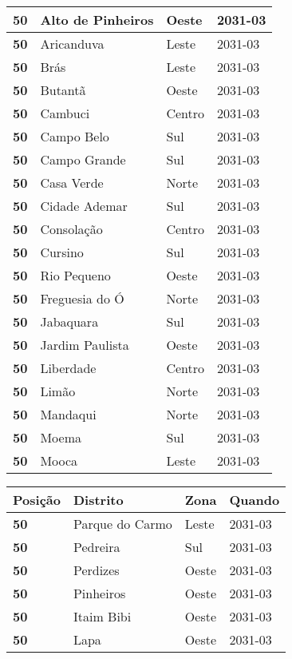 \begin{table}[H]
\begin{tabular}{l|l|l|l}
		\textbf{50} & Alto de Pinheiros & Oeste & 2031-03\\ \hline
		\textbf{50} & Aricanduva & Leste & 2031-03\\ \hline
		\textbf{50} & Brás & Leste & 2031-03\\ \hline
		\textbf{50} & Butantã & Oeste & 2031-03\\ \hline
		\textbf{50} & Cambuci & Centro & 2031-03\\ \hline
		\textbf{50} & Campo Belo & Sul & 2031-03\\ \hline
		\textbf{50} & Campo Grande & Sul & 2031-03\\ \hline
		\textbf{50} & Casa Verde & Norte & 2031-03\\ \hline
		\textbf{50} & Cidade Ademar & Sul & 2031-03\\ \hline
		\textbf{50} & Consolação & Centro & 2031-03\\ \hline
		\textbf{50} & Cursino & Sul & 2031-03\\ \hline
		\textbf{50} & Rio Pequeno & Oeste & 2031-03\\ \hline
		\textbf{50} & Freguesia do Ó & Norte & 2031-03\\ \hline
		\textbf{50} & Jabaquara & Sul & 2031-03\\ \hline
		\textbf{50} & Jardim Paulista & Oeste & 2031-03\\ \hline
		\textbf{50} & Liberdade & Centro & 2031-03\\ \hline
		\textbf{50} & Limão & Norte & 2031-03\\ \hline
		\textbf{50} & Mandaqui & Norte & 2031-03\\ \hline
		\textbf{50} & Moema & Sul & 2031-03\\ \hline
		\textbf{50} & Mooca & Leste & 2031-03\\ 
	\end{tabular}
\end{table}

\begin{table}[H]
	\centering
	\begin{tabular}{l|l|l|l}
		\textbf{Posição} & \textbf{Distrito} & \textbf{Zona} & \textbf{Quando} \\ \hline
			\textbf{50} & Parque do Carmo & Leste & 2031-03\\ \hline
			\textbf{50} & Pedreira & Sul & 2031-03\\ \hline
			\textbf{50} & Perdizes & Oeste & 2031-03\\ \hline
			\textbf{50} & Pinheiros & Oeste & 2031-03\\ \hline
			\textbf{50} & Itaim Bibi & Oeste & 2031-03\\ \hline
			\textbf{50} & Lapa & Oeste & 2031-03\\ 	
	\end{tabular}
\end{table}

